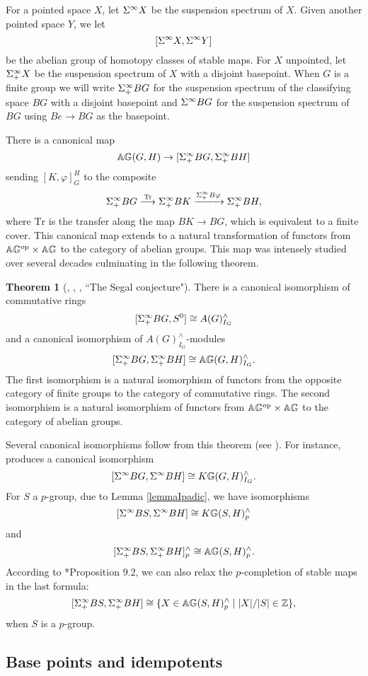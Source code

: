 \documentclass[10pt]{amsart}
\theoremstyle{definition}
\newtheorem{theorem}{Theorem}[section]
\renewcommand{\phi}{\varphi}
\DeclarePairedDelimiter{\abs}{\lvert}{\rvert}
\begin{document}
For a pointed space $X$, let $\Sigma^{\infty} X$ be the suspension spectrum of $X$. Given another pointed space $Y$, we let
\[
[\Sigma^{\infty} X, \Sigma^{\infty} Y]
\]
be the abelian group of homotopy classes of stable maps. For $X$ unpointed, let $\Sigma^{\infty}_{+} X$ be the suspension spectrum of $X$ with a disjoint basepoint. When $G$ is a finite group we will write $\Sigma^{\infty}_{+} BG$ for the suspension spectrum of the classifying space $BG$ with a disjoint basepoint and $\Sigma^{\infty} BG$ for the suspension spectrum of $BG$ using $Be \rightarrow BG$ as the basepoint.

There is a canonical map
\[
\mathbb{A} \mathbb{G}(G,H) \rightarrow [\Sigma^{\infty}_{+} BG,\Sigma^{\infty}_{+} BH]
\]
sending $[K,\phi]_{G}^{H}$ to the composite
\[
\Sinfp BG \lra{\text{Tr}} \Sinfp BK \xrightarrow{\Sinfp B\phi} \Sinfp BH,
\]
where $\text{Tr}$ is the transfer along the map $BK \to BG$, which is equivalent to a finite cover. This canonical map extends to a natural transformation of functors from $\mathbb{A} \mathbb{G}^{\mathrm{op}} \times \mathbb{A} \mathbb{G}$ to the category of abelian groups. This map was intensely studied over several decades culminating in the following theorem.


\begin{theorem}[\cite{CarlssonSegal}, \cite{AGM}, \cite{LewisMayMcClure}, ``The Segal conjecture"] \label{SegalConj}
There is a canonical isomorphism of commutative rings
\[
[\Sigma^{\infty}_{+} BG,S^0] \cong A(G)^{\wedge}_{I_G}
\]
and a canonical isomorphism of $A(G)^{\wedge}_{I_G}$-modules
\[
[\Sigma^{\infty}_{+} BG,\Sigma^{\infty}_{+} BH] \cong \mathbb{A} \mathbb{G}(G,H)^{\wedge}_{I_G}.
\]
The first isomorphism is a natural isomorphism of functors from the opposite category of finite groups to the category of commutative rings. The second isomorphism is a natural isomorphism of functors from $\mathbb{A} \mathbb{G}^{\mathrm{op}} \times \mathbb{A} \mathbb{G}$ to the category of abelian groups.
\end{theorem}

Several canonical isomorphisms follow from this theorem (see \cite{MayStableMaps}). For instance, \cite[Theorem 13]{MayStableMaps} produces a canonical isomorphism
\[
[\Sigma^{\infty} BG,\Sigma^{\infty} BH] \cong K \mathbb{G}(G,H)^{\wedge}_{I_G}.
\]
For $S$ a $p$-group, due to Lemma \ref{lemmaIpadic}, we have isomorphisms
\[
[ \Sigma^{\infty} BS, \Sigma^{\infty} BH] \cong K \mathbb{G}(S,H)^{\wedge}_{p}
\]
and
\[
[\Sigma^{\infty}_{+} BS,\Sigma^{\infty}_{+} BH]^{\wedge}_{p} \cong \mathbb{A} \mathbb{G}(S,H)^{\wedge}_{p}.
\]
According to \cite{RagnarssonStancu}*{Proposition 9.2}, we can also relax the $p$-completion of stable maps in the last formula:
\[
[\Sinfp BS,\Sinfp BH] \cong \{X\in \AG(S,H)^{\wedge}_{p} \mid \abs{X}/\abs{S}\in \Z\},
\]
when $S$ is a $p$-group.

\subsection{Base points and idempotents} \label{remarkDisjointBasepoints}
\end{document}
